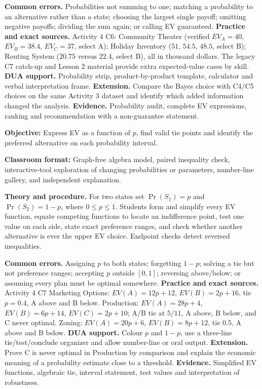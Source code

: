 \documentclass[10pt,letterpaper]{article}
\newcommand{\labelled}[2]{\textbf{#1:} #2\par}
\newcommand{\partheading}[1]{\Needspace{7\baselineskip}\par\vspace{4pt}{\bfseries #1\par}}
\begin{document}
\textbf{Common errors.} Probabilities not summing to one; matching a probability
to an alternative rather than a state; choosing the largest single payoff;
omitting negative payoffs; dividing the sum again; or calling EV guaranteed.
\textbf{Practice and exact sources.} Activity 4 C6: Community Theater
(verified $EV_A=40$, $EV_B=38.4$, $EV_C=37$, select A); Holiday Inventory
($51$, $54.5$, $48.5$, select B); Routing System ($20.75$ versus $22.4$,
select B), all in thousand dollars. The legacy C7 catch-up and Lesson 2 material
provide extra expected-value cases by skill. \textbf{DUA support.} Probability
strip, product-by-product template, calculator and verbal interpretation frame.
\textbf{Extension.} Compare the Bayes choice with C4/C5 choices on the same
Activity 3 dataset and identify which added information changed the analysis.
\textbf{Evidence.} Probability audit, complete EV expressions, ranking and
recommendation with a non-guarantee statement.

\partheading{Part 3---C7: Probability Sensitivity}
\labelled{Objective}{Express EV as a function of $p$, find valid tie points and identify the preferred alternative on each probability interval.}
\labelled{Classroom format}{Graph-free algebra model, paired inequality check, interactive-tool exploration of changing probabilities or parameters, number-line gallery, and independent explanation.}
\textbf{Theory and procedure.} For two states set $\Pr(S_1)=p$ and
$\Pr(S_2)=1-p$, where $0\leq p\leq1$. Students form and simplify every EV
function, equate competing functions to locate an indifference point, test one
value on each side, state exact preference ranges, and check whether another
alternative is ever the upper EV choice. Endpoint checks detect reversed
inequalities.

\textbf{Common errors.} Assigning $p$ to both states; forgetting $1-p$;
solving a tie but not preference ranges; accepting $p$ outside $[0,1]$;
reversing above/below; or assuming every plan must be optimal somewhere.
\textbf{Practice and exact sources.} Activity 4 C7 Marketing Options:
$EV(A)=12p+12$, $EV(B)=2p+16$, tie $p=0.4$, A above and B below. Production:
$EV(A)=28p+4$, $EV(B)=6p+14$, $EV(C)=2p+10$; A/B tie at $5/11$, A above, B
below, and C never optimal. Zoning: $EV(A)=20p+6$, $EV(B)=8p+12$, tie $0.5$,
A above and B below. \textbf{DUA support.} Colour $p$ and $1-p$, use a
three-line tie/test/conclude organizer and allow number-line or oral output.
\textbf{Extension.} Prove C is never optimal in Production by comparison and
explain the economic meaning of a probability estimate close to a threshold.
\textbf{Evidence.} Simplified EV functions, algebraic tie, interval statement,
test values and interpretation of robustness.
\end{document}
